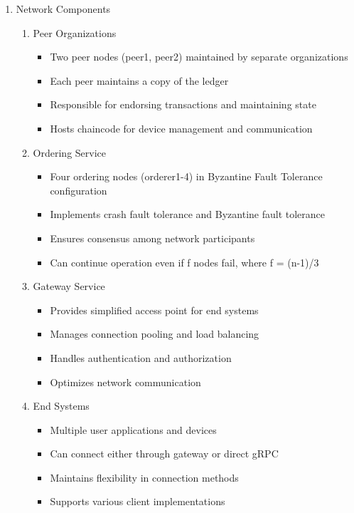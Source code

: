 \documentclass[conference]{IEEEtran}
\begin{document}
\begin{enumerate}[itemsep=2ex, parsep=1ex]
	\item{Network Components}
		
	\begin{enumerate}
		\item Peer Organizations
		      \begin{itemize}[itemsep=0.5pt, parsep=0.5pt]
		      	\item Two peer nodes (peer1, peer2) maintained by separate organizations
		      	\item Each peer maintains a copy of the ledger
		      	\item Responsible for endorsing transactions and maintaining state
		      	\item Hosts chaincode for device management and communication
		      \end{itemize}
		      		      
		\item Ordering Service
		      \begin{itemize}[itemsep=0.5pt, parsep=0.5pt]
		      	\item Four ordering nodes (orderer1-4) in Byzantine Fault Tolerance configuration
		      	\item Implements crash fault tolerance and Byzantine fault tolerance
		      	\item Ensures consensus among network participants
		      	\item Can continue operation even if f nodes fail, where f = (n-1)/3
		      \end{itemize}
		      		      
		\item Gateway Service
		      \begin{itemize}[itemsep=0.5pt, parsep=0.5pt]
		      	\item Provides simplified access point for end systems
		      	\item Manages connection pooling and load balancing
		      	\item Handles authentication and authorization
		      	\item Optimizes network communication
		      \end{itemize}
		      		      
		\item End Systems
		      \begin{itemize}[itemsep=0.5pt, parsep=0.5pt]
		      	\item Multiple user applications and devices
		      	\item Can connect either through gateway or direct gRPC
		      	\item Maintains flexibility in connection methods
		      	\item Supports various client implementations
		      \end{itemize}
	\end{enumerate}
		

\end{enumerate}
\end{document}
